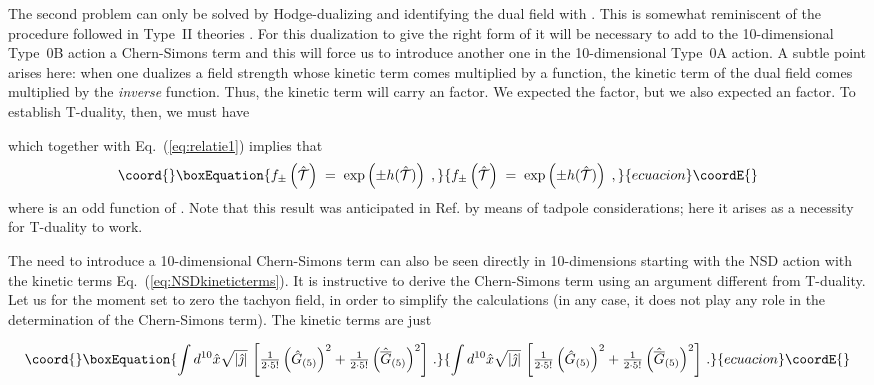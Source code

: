 \documentclass[12pt,a4paper]{article}
\begin{document}
The second problem can only be solved by Hodge-dualizing \coordHE{}
and identifying the dual field with \coordHE{}.  This is somewhat
reminiscent of the procedure followed in Type~II theories
\cite{kn:MO}. For this dualization to give the right form of
\coordHE{} it will be necessary to add to the 10-dimensional
Type~0B action a Chern-Simons term and this will force us to introduce
another one in the 10-dimensional Type~0A action. A subtle point
arises here: when one dualizes a field strength whose kinetic term
comes multiplied by a function, the kinetic term of the dual field
comes multiplied by the {\it inverse} function. Thus, the \coordHE{}
kinetic term will carry an \coordHE{} factor. We expected the
\coordHE{} factor, but we also expected an \coordHE{} factor. To establish
T-duality, then, we must have
\coordHE{}

which together with  Eq.~(\ref{eq:relatie1}) implies that
\begin{equation}\coord{}\boxEquation{
  \label{eq:def_f}
  f_{\pm}\left(\hat{\mathcal{T}}\right) \;=\; 
       \exp\left( \pm h(\hat{\mathcal{T}})\right) \; ,
}{
  f_{\pm}\left(\hat{\mathcal{T}}\right) \;=\; 
       \exp\left( \pm h(\hat{\mathcal{T}})\right) \; ,
}{ecuacion}\coordE{}\end{equation}
where \coordHE{} is an odd function of \coordHE{}.
Note that this result was anticipated in Ref. \cite{kn:KlTs3}
by means of tadpole considerations; here it arises as a necessity
for T-duality to work. 
\par
The need to introduce a 10-dimensional Chern-Simons term can also be
seen directly in 10-dimensions starting with the NSD action with the
kinetic terms Eq.~(\ref{eq:NSDkineticterms}). It is instructive to
derive the Chern-Simons term using an argument different from
T-duality. Let us for the moment set to zero the tachyon field, in order 
to simplify the calculations (in any case, it does not play any role in
the determination of the Chern-Simons term). The kinetic terms are
just

\begin{equation}\coord{}\boxEquation{
\int d^{10}\hat{x}\sqrt{|\hat{\jmath}|}\,
\left[ 
{\textstyle\frac{1}{2\cdot 5!}}\left(\hat{G}_{(5)}\right)^{2}
+{\textstyle\frac{1}{2\cdot 5!}}\left(\hat{\overline{G}}_{(5)}\right)^{2}
\right]\, .
}{
\int d^{10}\hat{x}\sqrt{|\hat{\jmath}|}\,
\left[ 
{\textstyle\frac{1}{2\cdot 5!}}\left(\hat{G}_{(5)}\right)^{2}
+{\textstyle\frac{1}{2\cdot 5!}}\left(\hat{\overline{G}}_{(5)}\right)^{2}
\right]\, .
}{ecuacion}\coordE{}\end{equation}
\end{document}
